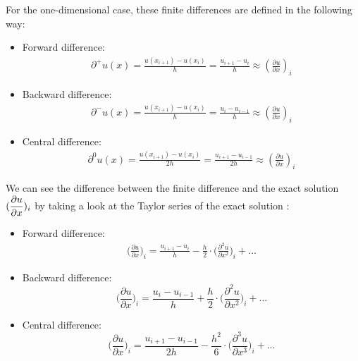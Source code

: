 For the one-dimensional case, these finite differences are defined in the following way:
\begin{itemize}
\item Forward difference:
\begin{align}
\partial ^+ u(x) = \frac{u(x_{i+1}) - u(x_i)}{h} = \frac{u_{i+1} - u_i}{h} \approx (\frac{\partial u}{\partial x})_i %
\end{align}
\item Backward difference: 
\begin{align}
\partial ^- u(x) = \frac{u(x_{i+1}) - u(x_i)}{h} = \frac{u_{i} - u_{i-1}}{h} \approx (\frac{\partial u}{\partial x})_i %
\end{align}
\item Central difference: 
\begin{align}
\partial ^0 u(x) = \frac{u(x_{i+1}) - u(x_i)}{2h} = \frac{u_{i+1} - u_{i-1}}{2h} \approx (\frac{\partial u}{\partial x})_i %
\end{align}
\end{itemize}



We can see the difference between the finite difference and the exact solution $\mathlarger{(\frac{\partial u}{\partial x})_i}$ by taking a look at the Taylor series of the exact solution \cite{langer}:

\begin{itemize}
\item Forward difference: 
\begin{align}
\Big(\frac{\partial u}{\partial x}\Big)_i =  \frac{u_{i+1}-u_i}{h} - \frac{h}{2} \cdot \Big (\frac{\partial^2 u}{\partial x^2}\Big)_i + \hdots
\end{align}
\item Backward difference: 
\begin{equation}
\Big(\frac{\partial u}{\partial x}\Big)_i =  \frac{u_{i}-u_{i-1}}{h} + \frac{h}{2} \cdot \Big (\frac{\partial ^2 u}{\partial x^2}\Big)_i + \hdots
\end{equation}
\item Central difference: 
\begin{equation}
\Big(\frac{\partial u}{\partial x}\Big)_i =  \frac{u_{i+1} - u_{i-1}}{2h} - \frac{h^2}{6} \cdot \Big (\frac{\partial^3 u}{\partial x^3}\Big )_i + \hdots
\end{equation}
\end{itemize}

